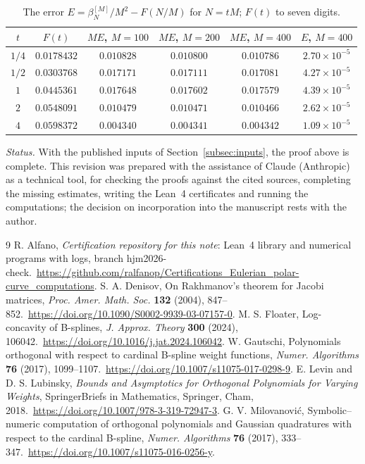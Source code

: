\documentclass{math}
\renewcommand{\baselinestretch}{1.08}
\newcommand{\TJMWholeURL}[1]{\mbox{\url{#1}}}
\newcommand{\urlsep}{\hspace{0pt plus 1fil}\penalty0\hspace{0pt plus -1fil}\ }
\begin{document}
\begin{table}[h]
\caption{The error $E=\beta_N^{[M]}/M^2-F(N/M)$ for $N=tM$; $F(t)$ to seven digits.}\label{tab:beta}
\vspace{10pt}
\centering
\begin{tabular}{@{}cccccc@{}}
\toprule
$t$ & $F(t)$ & $ME$, $M=100$ & $ME$, $M=200$ & $ME$, $M=400$ & $E$, $M=400$\\
\midrule
$1/4$ & $0.0178432$ & $0.010828$ & $0.010800$ & $0.010786$ & $2.70\times10^{-5}$\\
$1/2$ & $0.0303768$ & $0.017171$ & $0.017111$ & $0.017081$ & $4.27\times10^{-5}$\\
$1$   & $0.0445361$ & $0.017648$ & $0.017602$ & $0.017579$ & $4.39\times10^{-5}$\\
$2$   & $0.0548091$ & $0.010479$ & $0.010471$ & $0.010466$ & $2.62\times10^{-5}$\\
$4$   & $0.0598372$ & $0.004340$ & $0.004341$ & $0.004342$ & $1.09\times10^{-5}$\\
\bottomrule
\end{tabular}
\end{table}

\emph{Status.} With the published inputs of Section~\ref{subsec:inputs}, the proof above is complete. This revision was prepared with the assistance of Claude (Anthropic) as a technical tool, for checking the proofs against the cited sources, completing the missing estimates, writing the Lean~4 certificates and running the computations; the decision on incorporation into the manuscript rests with the author.

\renewcommand{\refname}{References.}
\renewcommand{\baselinestretch}{1}\selectfont
\begin{thebibliography}{9}
 R. Alfano, \emph{Certification repository for this note}: Lean~4 library and numerical programs with logs, branch hjm2026-check.\urlsep\TJMWholeURL{https://github.com/ralfanop/Certifications_Eulerian_polar-curve_computations}.
 S. A. Denisov, On Rakhmanov's theorem for Jacobi matrices, \emph{Proc. Amer. Math. Soc.} \textbf{132} (2004), 847--852.\urlsep\TJMWholeURL{https://doi.org/10.1090/S0002-9939-03-07157-0}.
 M. S. Floater, Log-concavity of B-splines, \emph{J. Approx. Theory} \textbf{300} (2024), 106042.\urlsep\TJMWholeURL{https://doi.org/10.1016/j.jat.2024.106042}.
 W. Gautschi, Polynomials orthogonal with respect to cardinal B-spline weight functions, \emph{Numer. Algorithms} \textbf{76} (2017), 1099--1107.\urlsep\TJMWholeURL{https://doi.org/10.1007/s11075-017-0298-9}.
 E. Levin and D. S. Lubinsky, \emph{Bounds and Asymptotics for Orthogonal Polynomials for Varying Weights}, SpringerBriefs in Mathematics, Springer, Cham, 2018.\urlsep\TJMWholeURL{https://doi.org/10.1007/978-3-319-72947-3}.
 G. V. Milovanovi\'c, Symbolic--numeric computation of orthogonal polynomials and Gaussian quadratures with respect to the cardinal B-spline, \emph{Numer. Algorithms} \textbf{76} (2017), 333--347.\urlsep\TJMWholeURL{https://doi.org/10.1007/s11075-016-0256-y}.
\end{thebibliography}
\end{document}
